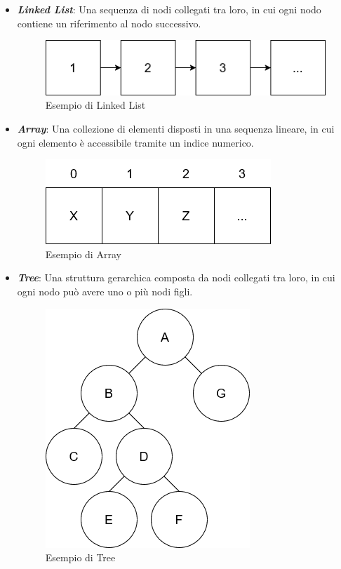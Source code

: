 \documentclass[12pt,a4paper,openright,twoside]{book}
\begin{document}
        \begin{itemize}
            \item \textit{\textbf{Linked List}}: Una sequenza di nodi collegati tra loro, in cui ogni nodo contiene un riferimento al nodo successivo.
            \begin{figure} [h]
                \centering
                \includegraphics[width=.4\linewidth]{figures/LinkedList.png}
                \caption{Esempio di Linked List}
                \label{fig:linked-list}
            \end{figure}

            \item \textit{\textbf{Array}}: Una collezione di elementi disposti in una sequenza lineare, in cui ogni elemento è accessibile tramite un indice numerico.
            \begin{figure} [h]
                \centering
                \includegraphics[width=.3\linewidth]{figures/Array.png}
                \caption{Esempio di Array}
                \label{fig:array}
            \end{figure}

            \pagebreak

            \item \textit{\textbf{Tree}}: Una struttura gerarchica composta da nodi collegati tra loro, in cui ogni nodo può avere uno o più nodi figli.
            \begin{figure} [h]
                \centering
                \includegraphics[width=.25\linewidth]{figures/Tree.png}
                \caption{Esempio di Tree}
                \label{fig:generic-tree}
            \end{figure}


\end{itemize}
\end{document}
